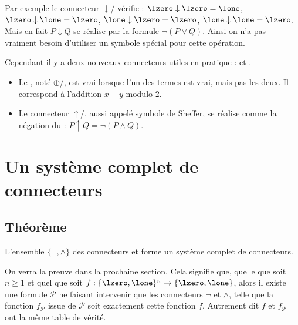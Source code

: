 \documentclass[11pt,class=report,crop=false]{standalone}
\begin{document}
\medskip

Par exemple le connecteur $\downarrow$/ vérifie : 
$\lzero\downarrow\lzero=\lone$, 
$\lzero\downarrow\lone=\lzero$, 
$\lone\downarrow\lzero=\lzero$, 
$\lone\downarrow\lone=\lzero$. 
Mais en fait $P \downarrow Q$ se réalise par la formule $\lnot(P \lor Q)$. Ainsi on n'a pas vraiment besoin d'utiliser un symbole spécial pour cette opération.

Cependant il y a deux nouveaux connecteurs utiles en pratique :  et .
\begin{itemize}
	\item Le , noté $\oplus$/, est vrai lorsque l'un des termes est vrai, mais pas les deux. Il correspond à l'addition $x+y$ modulo $2$.
	
	\item Le connecteur $\uparrow$/, aussi appelé symbole de Sheffer, se réalise comme la négation du \tand{} : $P \uparrow Q = \lnot(P\land Q)$.
\end{itemize}




\section{Un système complet de connecteurs}

\subsection{Théorème}

\begin{theoreme}
	L'ensemble $\{ \lnot, \land \}$ des connecteurs \tnot{} et \tand{} forme un système complet de connecteurs.
\end{theoreme}

On verra la preuve dans la prochaine section. Cela signifie que, quelle que soit $n \ge 1$ et quel que soit $f : \{\lzero,\lone\}^n \to \{\lzero,\lone\}$, alors il existe une formule $\mathcal{P}$ ne faisant intervenir que les connecteurs $\lnot$ et $\land$, telle que la fonction $f_{\mathcal{P}}$ issue de $\mathcal{P}$ soit exactement cette fonction $f$.
Autrement dit $f$ et $f_{\mathcal{P}}$ ont la même table de vérité.
\end{document}
